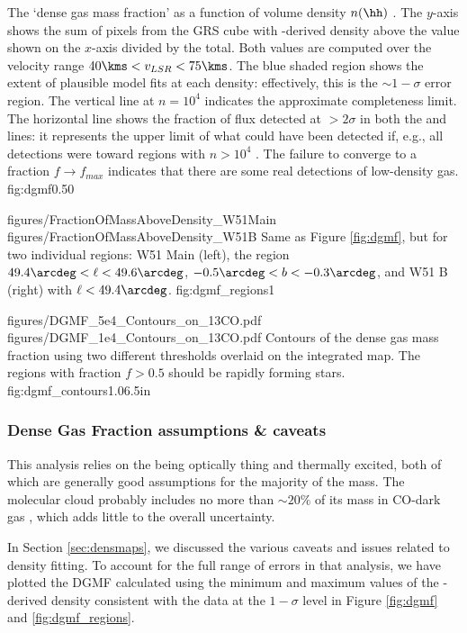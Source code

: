 {The `dense gas mass fraction' as a function of volume density $n(\hh)$ \percc.
The $y$-axis shows the sum of \thirteenco pixels from the GRS cube with
\formaldehyde-derived density above the value shown on the $x$-axis divided by
the total.  Both values are computed over the velocity range $40 \kms < v_{LSR}
< 75 \kms$.  The blue shaded region shows the extent of plausible model fits at
each density: effectively, this is the $\sim1-\sigma$ error region.  The
vertical line at $n=10^4$ \percc indicates the approximate completeness limit.
The horizontal line shows the fraction of \thirteenco flux detected at
$>2\sigma$ in both the \oneone and \twotwo lines: it represents the upper limit
of what could have been detected if, e.g., all \formaldehyde detections were
toward regions with $n>10^4$ \percc.  The failure to converge to a fraction
$f\rightarrow f_{max}$ indicates that there are some real detections of
low-density gas.}
{fig:dgmf}{0.5}{0}

\FigureTwo
{figures/FractionOfMassAboveDensity_W51Main}
{figures/FractionOfMassAboveDensity_W51B}
{Same as Figure \ref{fig:dgmf}, but for two individual regions: W51 Main
(left), the region $49.4\arcdeg < \ell < 49.6\arcdeg$, $-0.5\arcdeg < b <
-0.3\arcdeg$, and W51 B (right) with $\ell < 49.4\arcdeg$.  }
{fig:dgmf_regions}{1}

\FigureTwoAA
{figures/DGMF_5e4_Contours_on_13CO.pdf}
{figures/DGMF_1e4_Contours_on_13CO.pdf}
{Contours of the dense gas mass fraction using two different thresholds
overlaid on the integrated \thirteenco map.  The regions with fraction $f>0.5$
should be rapidly forming stars.  }
{fig:dgmf_contours}{1.0}{6.5in}

\subsubsection{Dense Gas Fraction assumptions \& caveats}

This analysis relies on the \thirteenco being optically thing and thermally
excited, both of which are generally good assumptions for the majority of the
mass.  The molecular cloud probably includes no more than $\sim20\%$ of its mass
in CO-dark gas \citep{Pineda2013a,Langer2013a,Smith2014b}, which adds little to
the overall uncertainty.

In Section \ref{sec:densmaps}, we discussed the various caveats and issues
related to \formaldehyde density fitting.  To account for the full range of
errors in that analysis, we have plotted the DGMF calculated using the minimum
and maximum values of the \formaldehyde-derived density consistent with the
data at the $1-\sigma$ level in Figure \ref{fig:dgmf} and
\ref{fig:dgmf_regions}.


